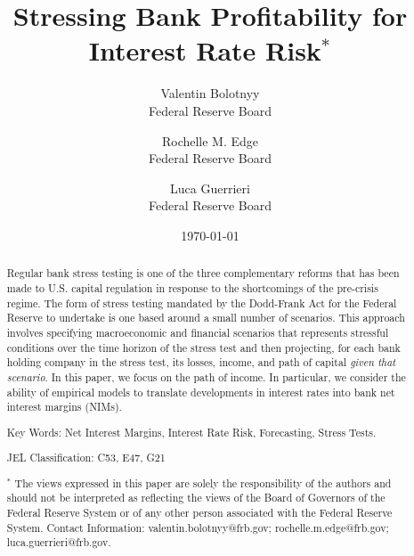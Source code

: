 \documentclass[11pt]{article}
\renewcommand{\baselinestretch}{1.5}
\begin{document}
\renewcommand{\baselinestretch}{1}
\author{{\Large Valentin Bolotnyy} \\
Federal Reserve Board \and
{\Large Rochelle M. Edge} \\
Federal Reserve Board \and
{\Large Luca Guerrieri}\\ Federal Reserve Board} 
\title{Stressing Bank Profitability for Interest Rate Risk$^*$}

 
\date{\today}
\maketitle

\begin{abstract}
 Regular bank stress testing is one of the three complementary reforms that has been made to U.S. capital regulation in response to the shortcomings of the pre-crisis regime.
 The form of stress testing mandated by the Dodd-Frank Act for the Federal Reserve to undertake is one based around a small number of scenarios.  This approach involves specifying macroeconomic and financial scenarios that represents stressful conditions over the time horizon of the stress test and then projecting, for each bank holding company in the stress test, its losses, income, and path of capital \textit{given that scenario}. In this paper, we focus on the path of income. In particular, we consider the ability of empirical models to translate developments in interest rates into bank net interest margins (NIMs).

\vspace{.125in}

\noindent Key Words: Net Interest Margins, Interest Rate Risk, Forecasting, Stress Tests.

\vspace{.125in}

\noindent JEL Classification: C53, E47, G21

\vspace{2cm}
\noindent $^*$ The views
expressed in this paper are solely the responsibility of the
authors and should not be interpreted as reflecting the views of
the Board of Governors of the Federal Reserve System or of any
other person associated with the Federal Reserve System.
Contact Information: valentin.bolotnyy@frb.gov; rochelle.m.edge@frb.gov; luca.guerrieri@frb.gov.




\end{abstract}
\renewcommand{\baselinestretch}{1.5}
\thispagestyle{empty}
\end{document}
